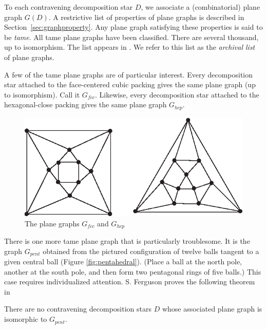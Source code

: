 To each contravening decomposition star $D$, we associate a
(combinatorial) plane graph $G(D)$.  A restrictive list of
properties of plane graphs is described in
Section~\ref{sec:graphproperty}. Any plane graph satisfying these
properties is said to be {\it tame}. All  tame plane
graphs have been classified. There are several thousand, up to
isomorphism.  The list appears in \cite{web}.  We refer to this
list as the {\it archival list} of
plane graphs.


A few of the tame plane graphs are of particular interest. Every
decomposition star attached to the face-centered cubic packing gives the
same plane graph (up to isomorphism).  Call it $G_{fcc}$.  Likewise,
every decomposition star attached to the hexagonal-close packing gives
the same plane graph $G_{hcp}$.
\begin{figure}[htb]
  \centering
  \includegraphics{PS/gfcchcp.eps}
  \caption{The plane graphs $G_{fcc}$ and $G_{hcp}$}
  \label{fig:gfcchcp}
\end{figure}

There is one more tame plane graph that is particularly troublesome.
It is the graph $G_{pent}$ obtained from
the pictured configuration of twelve balls tangent to a given
central ball (Figure \ref{fig:pentahedral}). (Place a ball at the
north pole, another at the south pole, and then form two pentagonal
rings of five balls.) This case requires individualized attention.
S. Ferguson proves the following theorem in

\begin{theorem} [Ferguson] \label{lemma:ferguson}
There are no contravening decomposition stars $D$ whose associated
plane graph is isomorphic to $G_{pent}$.
\end{theorem}


